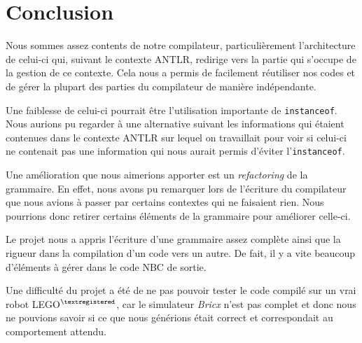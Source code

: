 \section{Conclusion}

Nous sommes assez contents de notre compilateur, particulièrement l'architecture de celui-ci qui, suivant le contexte ANTLR, redirige vers la partie qui s'occupe de la gestion de ce contexte. Cela nous a permis de facilement réutiliser nos codes et de gérer la plupart des parties du compilateur de manière indépendante.

Une faiblesse de celui-ci pourrait être l'utilisation importante de \texttt{instanceof}. Nous aurions pu regarder à une alternative suivant les informations qui étaient contenues dans le contexte ANTLR sur lequel on travaillait pour voir si celui-ci ne contenait pas une information qui nous aurait permis d'éviter l'\texttt{instanceof}.

 Une amélioration que nous aimerions apporter est un \emph{refactoring} de la grammaire. En effet, nous avons pu remarquer lors de l'écriture du compilateur que nous avions à passer par certains contextes qui ne faisaient rien. Nous pourrions donc retirer certains éléments de la grammaire pour améliorer celle-ci.
 
 Le projet nous a appris l'écriture d'une grammaire assez complète ainsi que la rigueur dans la compilation d'un code vers un autre. De fait, il y a vite beaucoup d'éléments à gérer dans le code NBC de sortie.
 
 Une difficulté du projet a été de ne pas pouvoir tester le code compilé sur un vrai robot LEGO$^{\textregistered}$, car le simulateur \emph{Bricx} n'est pas complet et donc nous ne pouvions savoir si ce que nous générions était correct et correspondait au comportement attendu. 
